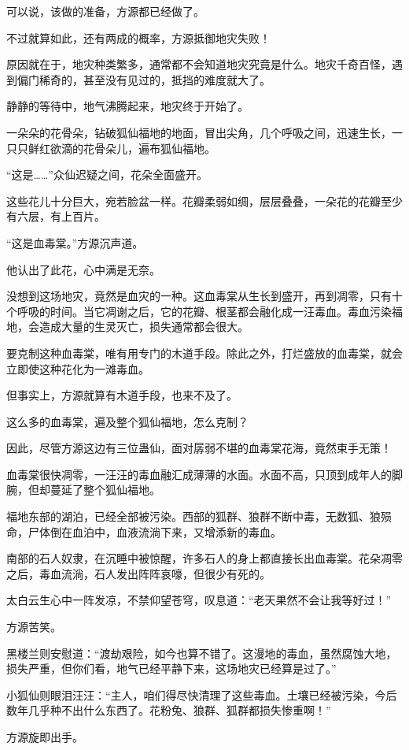 \begin{this_body}
可以说，该做的准备，方源都已经做了。

不过就算如此，还有两成的概率，方源抵御地灾失败！

原因就在于，地灾种类繁多，通常都不会知道地灾究竟是什么。地灾千奇百怪，遇到偏门稀奇的，甚至没有见过的，抵挡的难度就大了。

静静的等待中，地气沸腾起来，地灾终于开始了。

一朵朵的花骨朵，钻破狐仙福地的地面，冒出尖角，几个呼吸之间，迅速生长，一只只鲜红欲滴的花骨朵儿，遍布狐仙福地。

“这是……”众仙迟疑之间，花朵全面盛开。

这些花儿十分巨大，宛若脸盆一样。花瓣柔弱如绸，层层叠叠，一朵花的花瓣至少有六层，有上百片。

“这是血毒棠。”方源沉声道。

他认出了此花，心中满是无奈。

没想到这场地灾，竟然是血灾的一种。这血毒棠从生长到盛开，再到凋零，只有十个呼吸的时间。当它凋谢之后，它的花瓣、根茎都会融化成一汪毒血。毒血污染福地，会造成大量的生灵灭亡，损失通常都会很大。

要克制这种血毒棠，唯有用专门的木道手段。除此之外，打烂盛放的血毒棠，就会立即使这种花化为一滩毒血。

但事实上，方源就算有木道手段，也来不及了。

这么多的血毒棠，遍及整个狐仙福地，怎么克制？

因此，尽管方源这边有三位蛊仙，面对孱弱不堪的血毒棠花海，竟然束手无策！

血毒棠很快凋零，一汪汪的毒血融汇成薄薄的水面。水面不高，只顶到成年人的脚腕，但却蔓延了整个狐仙福地。

福地东部的湖泊，已经全部被污染。西部的狐群、狼群不断中毒，无数狐、狼殒命，尸体倒在血泊中，血液流淌下来，又增添新的毒血。

南部的石人奴隶，在沉睡中被惊醒，许多石人的身上都直接长出血毒棠。花朵凋零之后，毒血流淌，石人发出阵阵哀嚎，但很少有死的。

太白云生心中一阵发凉，不禁仰望苍穹，叹息道：“老天果然不会让我等好过！”

方源苦笑。

黑楼兰则安慰道：“渡劫艰险，如今也算不错了。这漫地的毒血，虽然腐蚀大地，损失严重，但你们看，地气已经平静下来，这场地灾已经算是过了。”

小狐仙则眼泪汪汪：“主人，咱们得尽快清理了这些毒血。土壤已经被污染，今后数年几乎种不出什么东西了。花粉兔、狼群、狐群都损失惨重啊！”

方源旋即出手。


\end{this_body}
